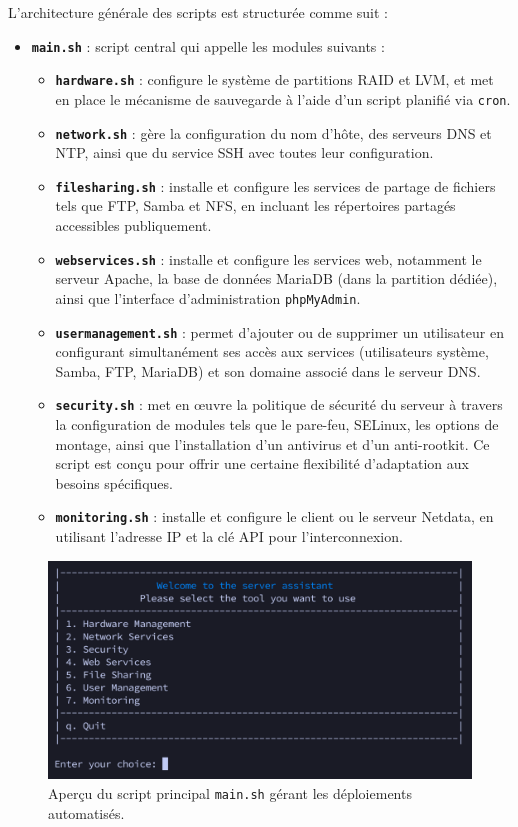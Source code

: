 \documentclass[a4paper,12pt]{article}
\begin{document}
L'architecture générale des scripts est structurée comme suit :

\begin{itemize}
    \item \textbf{\texttt{main.sh}} : script central qui appelle les modules suivants :
    \begin{itemize}
        \item \textbf{\texttt{hardware.sh}} : configure le système de partitions RAID et LVM, et met en place le mécanisme de sauvegarde à l'aide d'un script planifié via \texttt{cron}.
        \item \textbf{\texttt{network.sh}} : gère la configuration du nom d'hôte, des serveurs DNS et NTP, ainsi que du service SSH avec toutes leur configuration.
        
        \item \textbf{\texttt{filesharing.sh}} : installe et configure les services de partage de fichiers tels que FTP, Samba et NFS, en incluant les répertoires partagés accessibles publiquement.
        \item \textbf{\texttt{webservices.sh}} : installe et configure les services web, notamment le serveur Apache, la base de données MariaDB (dans la partition dédiée), ainsi que l'interface d'administration \texttt{phpMyAdmin}.
        \item \textbf{\texttt{usermanagement.sh}} : permet d'ajouter ou de supprimer un utilisateur en configurant simultanément ses accès aux services (utilisateurs système, Samba, FTP, MariaDB) et son domaine associé dans le serveur DNS.
        \item \textbf{\texttt{security.sh}} : met en œuvre la politique de sécurité du serveur à travers la configuration de modules tels que le pare-feu, SELinux, les options de montage, ainsi que l'installation d'un antivirus et d'un anti-rootkit. Ce script est conçu pour offrir une certaine flexibilité d'adaptation aux besoins spécifiques.
        \item \textbf{\texttt{monitoring.sh}} : installe et configure le client ou le serveur Netdata, en utilisant l'adresse IP et la clé API pour l'interconnexion.
    \end{itemize}
\end{itemize}


\begin{figure}[H]
    \centering
    \includegraphics[width=\textwidth]{main.png}
    \caption{Aperçu du script principal \texttt{main.sh} gérant les déploiements automatisés.}
    \label{fig:script-main}
\end{figure}
\end{document}
